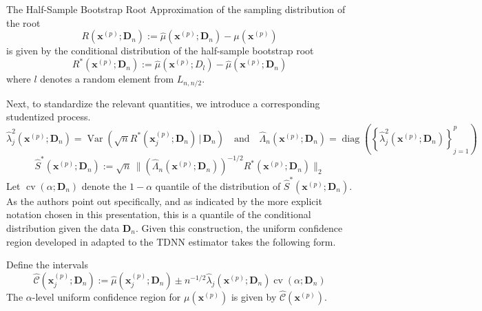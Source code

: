 \documentclass[letterpaper,10pt]{article}
\numberwithin{equation}{section}
\numberwithin{theorem}{section}
\theoremstyle{definition}
\renewcommand{\hat}{\widehat}
\newcommand{\1}{\mathbb{1}}
\begin{document}
\vspace{0.5cm}
\begin{definition}
	The Half-Sample Bootstrap Root Approximation of the sampling distribution of the root
	\begin{equation}
		R\left(\mathbf{x}^{(p)}; \mathbf{D}_n\right)
		:= \hat{\mu}\left(\mathbf{x}^{(p)}; \mathbf{D}_n\right) - \mu(\mathbf{x}^{(p)})
	\end{equation}
	is given by the conditional distribution of the half-sample bootstrap root
	\begin{equation}
		R^{*}\left(\mathbf{x}^{(p)}; \mathbf{D}_n\right)
		:= \hat{\mu}\left(\mathbf{x}^{(p)}; D_l\right) - \hat{\mu}\left(\mathbf{x}^{(p)}; \mathbf{D}_n\right)
	\end{equation}
	where $l$ denotes a random element from $L_{n, n/2}$.
\end{definition}
Next, to standardize the relevant quantities, we introduce a corresponding studentized process.
\begin{equation}
	\hat{\lambda}_{j}^{2}\left(\mathbf{x}^{(p)}; \mathbf{D}_n\right) = \operatorname{Var}\left(\sqrt{n} R^{*}(\mathbf{x}^{(p)}_{j}; \mathbf{D}_n) \, | \, \mathbf{D}_n\right)
	\quad \text{and} \quad
	\hat{\Lambda}_n\left(\mathbf{x}^{(p)}; \mathbf{D}_n\right) = \operatorname{diag}\left(\left\{\hat{\lambda}_{j}^{2}\left(\mathbf{x}^{(p)}; \mathbf{D}_n\right)\right\}_{j = 1}^{p}\right)
\end{equation}
\begin{equation}
	\hat{S}^{*}\left(\mathbf{x}^{(p)}; \mathbf{D}_n\right)
	:= \sqrt{n} \, \Big\| \left(\hat{\Lambda}_n\left(\mathbf{x}^{(p)}; \mathbf{D}_n\right)\right)^{-1/2} R^{*}\left(\mathbf{x}^{(p)}; \mathbf{D}_n\right)\Big\|_{2}
\end{equation}
Let $\operatorname{cv}\left(\alpha; \mathbf{D}_n\right)$ denote the $1-\alpha$ quantile of the distribution of $\hat{S}^{*}\left(\mathbf{x}^{(p)}; \mathbf{D}_n\right)$.
As the authors point out specifically, and as indicated by the more explicit notation chosen in this presentation, this is a quantile of the conditional distribution given the data $\mathbf{D}_n$.
Given this construction, the uniform confidence region developed in \citet{ritzwoller_uniform_2024} adapted to the TDNN estimator takes the following form.

\vspace{0.5cm}
\begin{theorem}
	Define the intervals
	\begin{equation}
		\hat{\mathcal{C}}\left(\mathbf{x}^{(p)}_j; \mathbf{D}_n\right)
		:= \hat{\mu}\left(\mathbf{x}^{(p)}_{j}; \mathbf{D}_n\right) \pm
		n^{-1/2} \hat{\lambda}_{j}\left(\mathbf{x}^{(p)}; \mathbf{D}_n\right)\operatorname{cv}\left(\alpha; \mathbf{D}_n\right)
	\end{equation}
	The $\alpha$-level uniform confidence region for $\mu\left(\mathbf{x}^{(p)}\right)$ is given by $\hat{\mathcal{C}}\left(\mathbf{x}^{(p)}\right)$.
\end{theorem}
\end{document}
